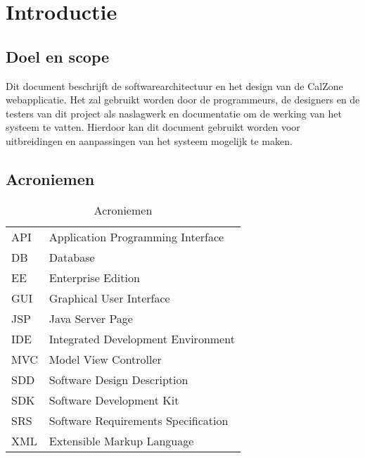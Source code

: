 \chapter{Introductie}

\section{Doel en scope}
Dit document beschrijft de softwarearchitectuur en het design van de CalZone webapplicatie.
Het zal gebruikt worden door de programmeurs, de designers en de testers van dit project als naslagwerk en documentatie om de werking van het systeem te vatten. 
Hierdoor kan dit document gebruikt worden voor uitbreidingen en aanpassingen van het systeem mogelijk te maken.


\section{Acroniemen}

\begin{table}[H]
	\centering
	\caption{Acroniemen}
	\label{tab:Acroniemen}
	\begin{tabular}{l | l}
	
	API	& Application Programming Interface\\

	DB	& Database\\
	
	EE	& Enterprise Edition\\

	GUI	& Graphical User Interface\\

	JSP & Java Server Page\\
	
	IDE	& Integrated Development Environment\\

	MVC & Model View Controller\\ 

	SDD	& Software Design Description\\

	SDK	& Software Development Kit\\

	SRS	& Software Requirements Specification\\
	
	XML & Extensible Markup Language\\
	
	\end{tabular}
\end{table}


